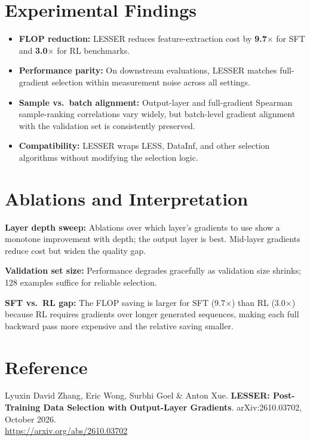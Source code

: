 \documentclass[10pt,twocolumn]{article}
\begin{document}
\section{Experimental Findings}

\begin{itemize}[itemsep=2pt,parsep=0pt]
  \item \textbf{FLOP reduction:} LESSER reduces feature-extraction cost by
    \textbf{9.7$\times$} for SFT and \textbf{3.0$\times$} for RL benchmarks.
  \item \textbf{Performance parity:} On downstream evaluations, LESSER matches
    full-gradient selection within measurement noise across all settings.
  \item \textbf{Sample vs.\ batch alignment:} Output-layer and full-gradient
    Spearman sample-ranking correlations vary widely, but batch-level gradient
    alignment with the validation set is consistently preserved.
  \item \textbf{Compatibility:} LESSER wraps LESS, DataInf, and other
    selection algorithms without modifying the selection logic.
\end{itemize}

\section{Ablations and Interpretation}

\textbf{Layer depth sweep:} Ablations over which layer's gradients to use show
a monotone improvement with depth; the output layer is best. Mid-layer gradients
reduce cost but widen the quality gap.

\textbf{Validation set size:} Performance degrades gracefully as validation size
shrinks; 128 examples suffice for reliable selection.

\textbf{SFT vs.\ RL gap:} The FLOP saving is larger for SFT (9.7$\times$) than
RL (3.0$\times$) because RL requires gradients over longer generated sequences,
making each full backward pass more expensive and the relative saving smaller.

\section*{Reference}

Lyuxin David Zhang, Eric Wong, Surbhi Goel \& Anton Xue.
\textbf{LESSER: Post-Training Data Selection with Output-Layer Gradients}.
arXiv:2610.03702, October 2026.\\
\url{https://arxiv.org/abs/2610.03702}
\end{document}
